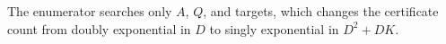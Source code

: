 The enumerator searches only \(A\), \(Q\), and targets, which changes the certificate count from doubly exponential in \(D\) to singly exponential in \(D^2+DK\).